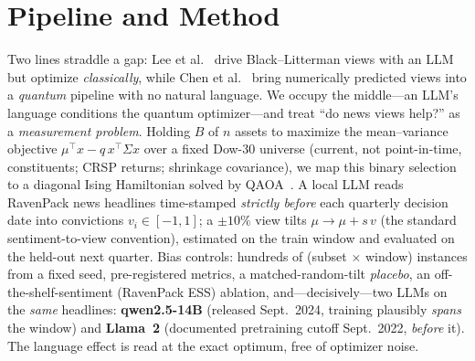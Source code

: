 \documentclass[runningheads]{llncs}
\begin{document}
\section{Pipeline and Method}
Two lines straddle a gap: Lee et al.~\cite{lee2025llmbl} drive Black--Litterman views
with an LLM but optimize \emph{classically}, while Chen et al.~\cite{chen2023qbl} bring numerically
predicted views into a \emph{quantum} pipeline with no natural language. We occupy the middle---an LLM's
language conditions the quantum optimizer---and treat ``do news views help?'' as a
\emph{measurement problem}. Holding $B$ of $n$ assets to maximize the mean--variance objective
$\mu^\top x - q\,x^\top\Sigma x$ over a fixed Dow-30 universe (current, not point-in-time, constituents;
CRSP returns; shrinkage covariance), we map this binary selection to a diagonal Ising Hamiltonian solved
by QAOA~\cite{farhi2014qaoa}. A local LLM reads RavenPack news headlines time-stamped \emph{strictly before}
each quarterly decision date into convictions $v_i\in[-1,1]$; a $\pm10\%$ view tilts $\mu\to\mu+s\,v$ (the
standard sentiment-to-view convention), estimated on the train window and evaluated on the held-out next
quarter. Bias controls: hundreds of (subset $\times$ window) instances from a fixed
seed, pre-registered metrics, a matched-random-tilt \emph{placebo}, an off-the-shelf-sentiment (RavenPack
ESS) ablation, and---decisively---two LLMs on the \emph{same} headlines: \textbf{qwen2.5-14B} (released
Sept.\ 2024, training plausibly \emph{spans} the window) and \textbf{Llama~2} (documented pretraining
cutoff Sept.\ 2022, \emph{before} it).
The language effect is read at the exact optimum, free of optimizer noise.
\end{document}
